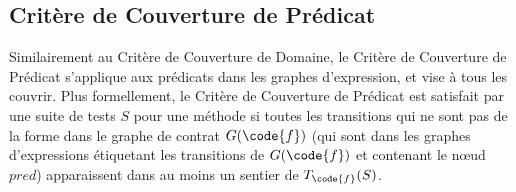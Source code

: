 \subsection{Critère de Couverture de Prédicat}

Similairement au Critère de Couverture de Domaine, le Critère de Couverture de
Prédicat s'applique aux prédicats dans les graphes d'expression, et vise à tous
les couvrir. Plus formellement, le Critère de Couverture de Prédicat est
satisfait par une suite de tests $S$ pour une méthode  si toutes les
transitions qui ne sont pas de la forme  dans le graphe de
contrat $G(\code{f})$ (qui sont dans les graphes d'expressions étiquetant les
transitions de $G(\code{f})$ et contenant le nœud $\mathit{pred}$) apparaissent
dans au moins un sentier de $T_\code{f}(S)$.

